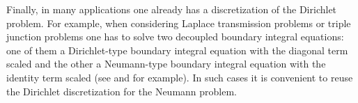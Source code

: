 Finally, in many applications one already has a discretization of the Dirichlet problem. For example, when considering Laplace transmission problems or triple junction problems one has to solve two decoupled boundary integral equations: one of them a Dirichlet-type boundary integral equation with the diagonal term scaled and the other a Neumann-type boundary integral equation with the identity term scaled (see \cite{hoskins2018numerical} and \cite{hoskins2019solution} for example). In such cases it is convenient to reuse the Dirichlet discretization for the Neumann problem.  

